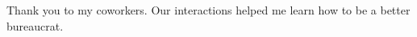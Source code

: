 \thispagestyle{empty}

Thank you to my coworkers. Our interactions helped me learn how to be a better bureaucrat.